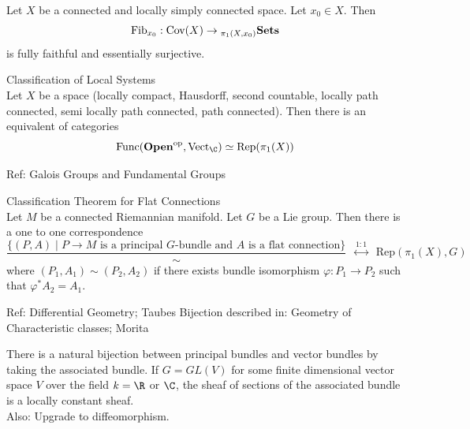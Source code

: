 \documentclass[a4paper]{article}
\begin{document}

\begin{thm}{}{}\\
Let $X$ be a connected and locally simply connected space. Let $x_0\in X$. Then $$\text{Fib}_{x_0}:\text{Cov}(X)\to{_{\pi_1(X,x_0)}}\bold{Sets}$$ is fully faithful and essentially surjective. 
\end{thm}

\begin{thm}{Classification of Local Systems}{}\\
Let $X$ be a space (locally compact, Hausdorff, second countable, locally path connected, semi locally path connected, path connected). Then there is an equivalent of categories $$\text{Func}(\bold{Open}^\text{op},\text{Vect}_\C)\simeq\text{Rep}(\pi_1(X))$$
\end{thm}


Ref: Galois Groups and Fundamental Groups

\begin{thm}{Classification Theorem for Flat Connections}{}\\
Let $M$ be a connected Riemannian manifold. Let $G$ be a Lie group. Then there is a one to one correspondence $$\frac{\{(P,A)\;|\;P\to M\text{ is a principal }G\text{-bundle and }A\text{ is a flat connection}\}}{\sim}\;\;\overset{1:1}{\longleftrightarrow}\;\;\text{Rep}(\pi_1(X),G)$$ where $(P_1,A_1)\sim(P_2,A_2)$ if there exists bundle isomorphism $\varphi:P_1\to P_2$ such that $\varphi^\ast A_2=A_1$. 
\end{thm}

Ref: Differential Geometry; Taubes
Bijection described in: Geometry of Characteristic classes; Morita

There is a natural bijection between principal bundles and vector bundles by taking the associated bundle. If $G=GL(V)$ for some finite dimensional vector space $V$ over the field $k=\R$ or $\C$, the sheaf of sections of the associated bundle is a locally constant sheaf. \\

Also: Upgrade to diffeomorphism. 
\end{document}
